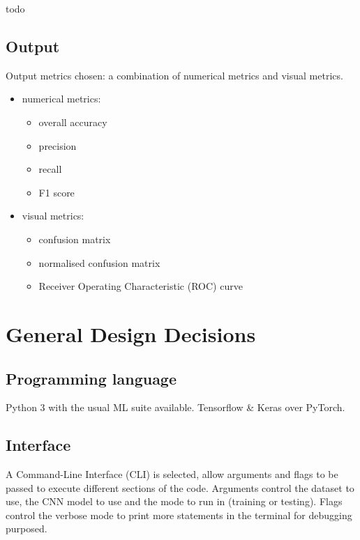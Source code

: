 todo

\subsection{Output}

Output metrics chosen: a combination of numerical metrics and visual metrics.


\begin{itemize}
    \item numerical metrics:
    \begin{itemize}
        \item overall accuracy
        \item precision
        \item recall
        \item F1 score
    \end{itemize}
    \item visual metrics:
    \begin{itemize}
        \item confusion matrix
        \item normalised confusion matrix
        \item Receiver Operating Characteristic (ROC) curve
    \end{itemize}
\end{itemize}


\section{General Design Decisions}

\subsection{Programming language}

Python 3 with the usual ML suite available.
Tensorflow \& Keras over PyTorch. %

\subsection{Interface}

A Command-Line Interface (CLI) is selected, allow arguments and flags to be passed to execute different sections of the code. Arguments control the dataset to use, the CNN model to use and the mode to run in (training or testing). Flags control the verbose mode to print more statements in the terminal for debugging purposed.